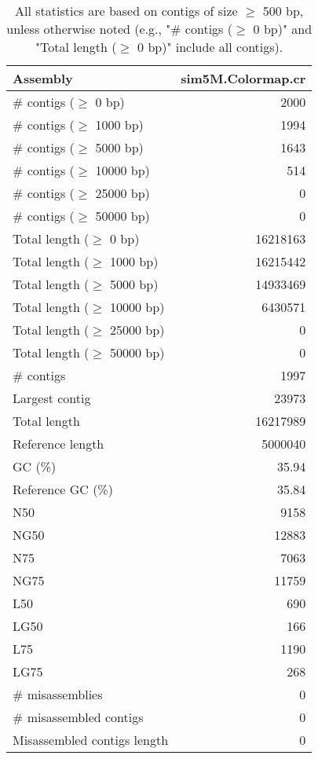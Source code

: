 \documentclass[12pt,a4paper]{article}
\begin{document}
\begin{table}[ht]
\begin{center}
\caption{All statistics are based on contigs of size $\geq$ 500 bp, unless otherwise noted (e.g., "\# contigs ($\geq$ 0 bp)" and "Total length ($\geq$ 0 bp)" include all contigs).}
\begin{tabular}{|l*{1}{|r}|}
\hline
Assembly & sim5M.Colormap.cr \\ \hline
\# contigs ($\geq$ 0 bp) & 2000 \\ \hline
\# contigs ($\geq$ 1000 bp) & 1994 \\ \hline
\# contigs ($\geq$ 5000 bp) & 1643 \\ \hline
\# contigs ($\geq$ 10000 bp) & 514 \\ \hline
\# contigs ($\geq$ 25000 bp) & 0 \\ \hline
\# contigs ($\geq$ 50000 bp) & 0 \\ \hline
Total length ($\geq$ 0 bp) & 16218163 \\ \hline
Total length ($\geq$ 1000 bp) & 16215442 \\ \hline
Total length ($\geq$ 5000 bp) & 14933469 \\ \hline
Total length ($\geq$ 10000 bp) & 6430571 \\ \hline
Total length ($\geq$ 25000 bp) & 0 \\ \hline
Total length ($\geq$ 50000 bp) & 0 \\ \hline
\# contigs & 1997 \\ \hline
Largest contig & 23973 \\ \hline
Total length & 16217989 \\ \hline
Reference length & 5000040 \\ \hline
GC (\%) & 35.94 \\ \hline
Reference GC (\%) & 35.84 \\ \hline
N50 & 9158 \\ \hline
NG50 & 12883 \\ \hline
N75 & 7063 \\ \hline
NG75 & 11759 \\ \hline
L50 & 690 \\ \hline
LG50 & 166 \\ \hline
L75 & 1190 \\ \hline
LG75 & 268 \\ \hline
\# misassemblies & 0 \\ \hline
\# misassembled contigs & 0 \\ \hline
Misassembled contigs length & 0 \\ \hline

\end{tabular}
\end{center}
\end{table}
\end{document}
